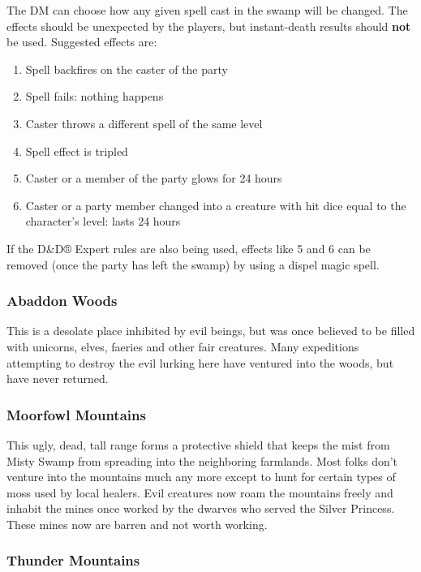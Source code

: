 \documentclass[palace_of_the_silver_princess]{subfiles}
\begin{document}
The DM can choose how any given spell cast in the swamp will be changed.
The effects should be unexpected by the players, but instant-death
results should \textbf{not} be used. Suggested effects are:

\begin{enumerate}
	\item Spell backfires on the caster of the party
	\item Spell fails: nothing happens
	\item Caster throws a different spell of the same level
	\item Spell effect is tripled
	\item Caster or a member of the party glows for 24 hours
	\item Caster or a party member changed into a creature with hit dice
		equal to the character’s level: lasts 24 hours
\end{enumerate}

If the D\&D® Expert rules are also being used, effects like 5 and 6 can
be removed (once the party has left the swamp) by using a dispel magic
spell.

\subsubsection{Abaddon Woods}

This is a desolate place inhibited by evil beings, but was once believed
to be filled with unicorns, elves, faeries and other fair creatures.
Many expeditions attempting to destroy the evil lurking here have
ventured into the woods, but have never returned.

\subsubsection{Moorfowl Mountains}

This ugly, dead, tall range forms a protective shield that keeps the
mist from Misty Swamp from spreading into the neighboring farmlands.
Most folks don’t venture into the mountains much any more except to hunt
for certain types of moss used by local healers. Evil creatures now roam
the mountains freely and inhabit the mines once worked by the dwarves
who served the Silver Princess. These mines now are barren and not worth
working.

\subsubsection{Thunder Mountains}
\end{document}
